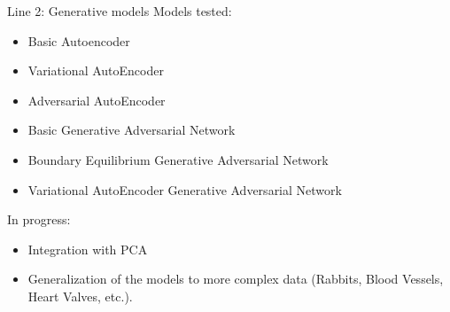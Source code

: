 \documentclass{beamer}
\begin{document}
\begin{frame}{Line 2: Generative models}
Models tested:
\begin{itemize}
\item Basic Autoencoder
\item Variational AutoEncoder
\item Adversarial AutoEncoder
\item Basic Generative Adversarial Network
\item Boundary Equilibrium Generative Adversarial Network
\item Variational AutoEncoder Generative Adversarial Network
\end{itemize}
In progress:
\begin{itemize}
\item Integration with PCA
\item Generalization of the models to more complex data (Rabbits, Blood Vessels, Heart Valves, etc.).
\end{itemize}
\end{frame}
\end{document}
